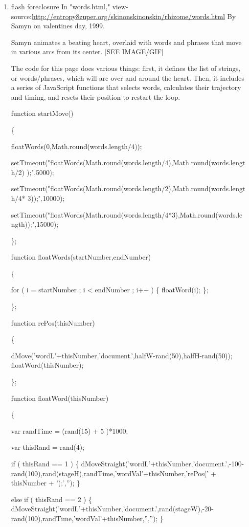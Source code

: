 \documentclass[11pt]{article}
\begin{document}
\begin{enumerate}

\item flash foreclosure
\label{sec:org56b715b}
In "words.html,"
view-source:\url{http://entropy8zuper.org/skinonskinonskin/rhizome/words.html}
By Samyn on valentines day, 1999.

Samyn animates a beating heart, overlaid with words and phrases that
move in various arcs from its center. [SEE IMAGE/GIF]

The code for this page does various things: first, it defines the list
of strings, or words/phrases, which will arc over and around the
heart. Then, it includes a series of JavaScript functions that selects
words, calculates their trajectory and timing, and resets their
position to restart the loop.
\begin{SOURCE}
function startMove()

\{

floatWords(0,Math.round(words.length/4));

setTimeout("floatWords(Math.round(words.length/4),Math.round(words.length/2)
);",5000);

setTimeout("floatWords(Math.round(words.length/2),Math.round(words.length/4*
3));",10000);

setTimeout("floatWords(Math.round(words.length/4*3),Math.round(words.length));",15000);

\};

function floatWords(startNumber,endNumber)

\{

for ( i = startNumber ; i < endNumber ; i++ ) \{ floatWord(i); \};

\};

function rePos(thisNumber)

\{


dMove('wordL'+thisNumber,'document.',halfW-rand(50),halfH-rand(50));
floatWord(thisNumber);

\};

function floatWord(thisNumber)

\{

var randTime = (rand(15) + 5 )*1000;

var thisRand = rand(4);

if ( thisRand == 1 ) \{ 
dMoveStraight('wordL'+thisNumber,'document.',-100-rand(100),rand(stageH),randTime,'wordVal'+thisNumber,'rePos(' +
thisNumber + ');',''); \}

else if ( thisRand == 2 ) \{
dMoveStraight('wordL'+thisNumber,'document.',rand(stageW),-20-rand(100),randTime,'wordVal'+thisNumber,'',''); \}


\end{SOURCE}
\end{enumerate}
\end{document}
